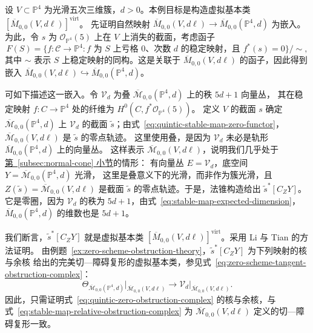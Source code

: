 \begin{example}\label{ex:quintic-virtual-class}
设 $V\subset\mathbb P^4$ 为光滑五次三维簇，$d>0$。本例目标是构造虚拟基本类
$[\overline M_{0,0}(V,d\ell)]^{\mathrm{virt}}$。
先证明自然映射 $\overline M_{0,0}(V,d\ell)\to\overline M_{0,0}(\mathbb P^4,d)$ 为嵌入。
为此，令 $s$ 为 $\mathcal O_{\mathbb P^4}(5)$ 上在 $V$ 上消失的截面，考虑函子
\begin{equation}\label{eq:quintic-stable-map-zero-functor}
F(S)=\{f:\mathcal C\to\mathbb P^4:
f\text{ 为 }S\text{ 上亏格 }0\text{、次数 }d\text{ 的稳定映射，且 }f^*(s)=0\}/\sim,
\end{equation}
其中 $\sim$ 表示 $S$ 上稳定映射的同构。这是关联于
$\overline M_{0,0}(V,d\ell)$ 的函子，因此得到嵌入
$\overline M_{0,0}(V,d\ell)\hookrightarrow\overline M_{0,0}(\mathbb P^4,d)$。

可如下描述这一嵌入。令 $\mathcal V_d$ 为叠
$\overline{\mathcal M}_{0,0}(\mathbb P^4,d)$ 上的秩 $5d+1$ 向量丛，
其在稳定映射 $f:C\to\mathbb P^4$ 处的纤维为 $H^0(C,f^*\mathcal O_{\mathbb P^4}(5))$。
定义 $V$ 的截面 $s$ 确定 $\overline{\mathcal M}_{0,0}(\mathbb P^4,d)$ 上
$\mathcal V_d$ 的截面 $\widetilde s$；由式~\eqref{eq:quintic-stable-map-zero-functor}，
$\overline{\mathcal M}_{0,0}(V,d\ell)$ 是 $\widetilde s$ 的零点轨迹。
这里使用叠，是因为 $\mathcal V_d$ 未必是轨形 $\overline M_{0,0}(\mathbb P^4,d)$ 上的向量丛。
这样表示 $\overline{\mathcal M}_{0,0}(V,d\ell)$，说明我们几乎处于\hyperref[subsec:normal-cone]{第~\ref*{subsec:normal-cone} 小节}的情形：
有向量丛 $E=\mathcal V_d$，底空间 $Y=\overline{\mathcal M}_{0,0}(\mathbb P^4,d)$ 光滑，
这里是叠意义下的光滑，而非作为簇光滑，且 $Z(\widetilde s)=\overline{\mathcal M}_{0,0}(V,d\ell)$
是截面 $\widetilde s$ 的零点轨迹。于是，法锥构造给出 $\widetilde s^*[C_ZY]$。
它是零圈，因为 $\mathcal V_d$ 的秩为 $5d+1$，由式~\eqref{eq:stable-map-expected-dimension}，
$\overline M_{0,0}(\mathbb P^4,d)$ 的维数也是 $5d+1$。

我们断言，$\widetilde s^*[C_ZY]$ 就是虚拟基本类
$[\overline M_{0,0}(V,d\ell)]^{\mathrm{virt}}$。采用 Li 与 Tian 的方法证明。
由例题~\ref{ex:zero-scheme-obstruction-theory}，$\widetilde s^*[C_ZY]$ 为下列映射的核与余核
给出的完美切—障碍复形的虚拟基本类，参见式~\eqref{eq:zero-scheme-tangent-obstruction-complex}：
\begin{equation}\label{eq:quintic-zero-obstruction-complex}
\Theta_{\overline{\mathcal M}_{0,0}(\mathbb P^4,d)}
\big|_{\overline{\mathcal M}_{0,0}(V,d\ell)}
\longrightarrow
\mathcal V_d\big|_{\overline{\mathcal M}_{0,0}(V,d\ell)}.
\end{equation}
因此，只需证明式~\eqref{eq:quintic-zero-obstruction-complex} 的核与余核，与
式~\eqref{eq:stable-map-relative-obstruction-complex} 为
$\overline{\mathcal M}_{0,0}(V,d\ell)$ 定义的切—障碍复形一致。


\end{example}
